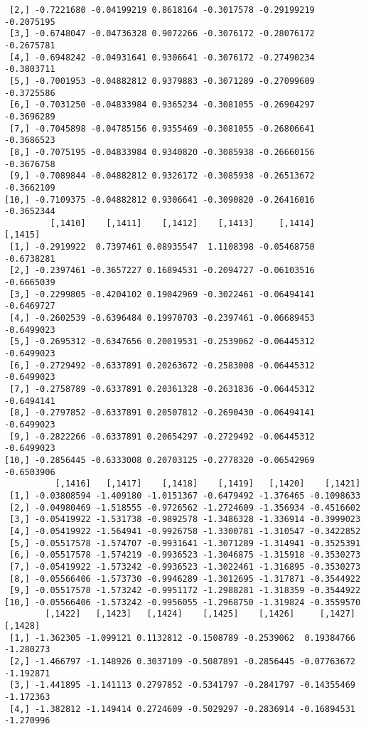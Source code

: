 \documentclass[
  letterpaper,
  DIV=11,
  numbers=noendperiod]{scrreprt}
\begin{document}
\begin{verbatim}
 [2,] -0.7221680 -0.04199219 0.8618164 -0.3017578 -0.29199219 -0.2075195
 [3,] -0.6748047 -0.04736328 0.9072266 -0.3076172 -0.28076172 -0.2675781
 [4,] -0.6948242 -0.04931641 0.9306641 -0.3076172 -0.27490234 -0.3803711
 [5,] -0.7001953 -0.04882812 0.9379883 -0.3071289 -0.27099609 -0.3725586
 [6,] -0.7031250 -0.04833984 0.9365234 -0.3081055 -0.26904297 -0.3696289
 [7,] -0.7045898 -0.04785156 0.9355469 -0.3081055 -0.26806641 -0.3686523
 [8,] -0.7075195 -0.04833984 0.9340820 -0.3085938 -0.26660156 -0.3676758
 [9,] -0.7089844 -0.04882812 0.9326172 -0.3085938 -0.26513672 -0.3662109
[10,] -0.7109375 -0.04882812 0.9306641 -0.3090820 -0.26416016 -0.3652344
         [,1410]    [,1411]    [,1412]    [,1413]     [,1414]    [,1415]
 [1,] -0.2919922  0.7397461 0.08935547  1.1108398 -0.05468750 -0.6738281
 [2,] -0.2397461 -0.3657227 0.16894531 -0.2094727 -0.06103516 -0.6665039
 [3,] -0.2299805 -0.4204102 0.19042969 -0.3022461 -0.06494141 -0.6469727
 [4,] -0.2602539 -0.6396484 0.19970703 -0.2397461 -0.06689453 -0.6499023
 [5,] -0.2695312 -0.6347656 0.20019531 -0.2539062 -0.06445312 -0.6499023
 [6,] -0.2729492 -0.6337891 0.20263672 -0.2583008 -0.06445312 -0.6499023
 [7,] -0.2758789 -0.6337891 0.20361328 -0.2631836 -0.06445312 -0.6494141
 [8,] -0.2797852 -0.6337891 0.20507812 -0.2690430 -0.06494141 -0.6499023
 [9,] -0.2822266 -0.6337891 0.20654297 -0.2729492 -0.06445312 -0.6499023
[10,] -0.2856445 -0.6333008 0.20703125 -0.2778320 -0.06542969 -0.6503906
          [,1416]   [,1417]    [,1418]    [,1419]   [,1420]    [,1421]
 [1,] -0.03808594 -1.409180 -1.0151367 -0.6479492 -1.376465 -0.1098633
 [2,] -0.04980469 -1.518555 -0.9726562 -1.2724609 -1.356934 -0.4516602
 [3,] -0.05419922 -1.531738 -0.9892578 -1.3486328 -1.336914 -0.3999023
 [4,] -0.05419922 -1.564941 -0.9926758 -1.3300781 -1.310547 -0.3422852
 [5,] -0.05517578 -1.574707 -0.9931641 -1.3071289 -1.314941 -0.3525391
 [6,] -0.05517578 -1.574219 -0.9936523 -1.3046875 -1.315918 -0.3530273
 [7,] -0.05419922 -1.573242 -0.9936523 -1.3022461 -1.316895 -0.3530273
 [8,] -0.05566406 -1.573730 -0.9946289 -1.3012695 -1.317871 -0.3544922
 [9,] -0.05517578 -1.573242 -0.9951172 -1.2988281 -1.318359 -0.3544922
[10,] -0.05566406 -1.573242 -0.9956055 -1.2968750 -1.319824 -0.3559570
        [,1422]   [,1423]   [,1424]    [,1425]    [,1426]     [,1427]   [,1428]
 [1,] -1.362305 -1.099121 0.1132812 -0.1508789 -0.2539062  0.19384766 -1.280273
 [2,] -1.466797 -1.148926 0.3037109 -0.5087891 -0.2856445 -0.07763672 -1.192871
 [3,] -1.441895 -1.141113 0.2797852 -0.5341797 -0.2841797 -0.14355469 -1.172363
 [4,] -1.382812 -1.149414 0.2724609 -0.5029297 -0.2836914 -0.16894531 -1.270996

\end{verbatim}
\end{document}
